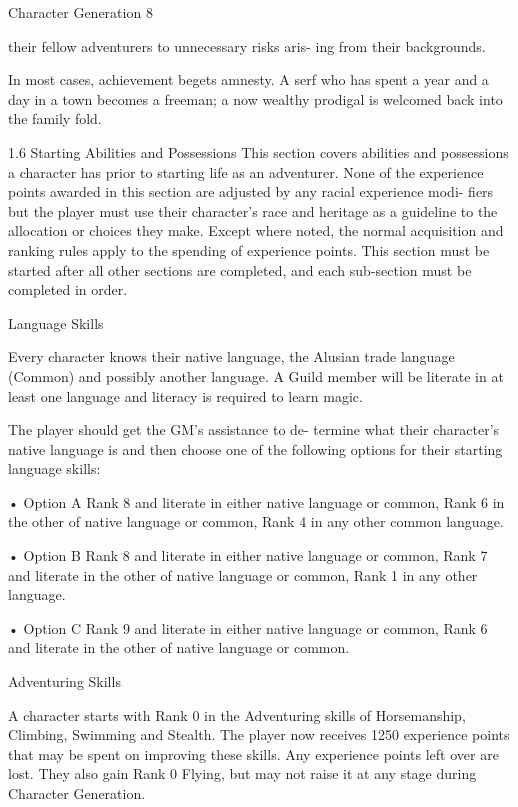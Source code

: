 \begin{Chapter}{Character Generation}
8 

their  fellow  adventurers  to  unnecessary  risks  aris-
ing from their backgrounds. 

In most cases, achievement begets amnesty. A serf 
who has spent a year and a day in a town becomes 
a  freeman;  a  now  wealthy  prodigal  is  welcomed 
back into the family fold. 

1.6 Starting Abilities and Possessions 
This  section  covers  abilities  and  possessions  a 
character has prior to starting life as an adventurer. 
None  of  the  experience  points  awarded  in  this 
section are adjusted by any racial experience modi-
fiers  but  the  player  must  use their character’s  race 
and  heritage  as  a  guideline  to  the  allocation  or 
choices they make. Except where noted, the normal 
acquisition and ranking rules apply to the spending 
of  experience  points.  This  section  must  be  started 
after  all  other  sections  are  completed,  and  each 
sub-section must be completed in order. 

Language Skills 

Every  character  knows  their  native  language,  the 
Alusian  trade  language  (Common)  and  possibly 
another language. A Guild member will be literate 
in at  least  one  language  and  literacy  is  required  to 
learn magic. 

The  player  should  get  the  GM’s  assistance  to  de-
termine  what  their  character’s  native  language  is 
and  then  choose  one  of  the  following  options  for 
their starting language skills: 

•  Option  A  Rank  8  and  literate  in  either  native 
language or common, Rank 6 in the other of native 
language or common, Rank 4 in any other common 
language. 

•  Option  B  Rank  8  and  literate  in  either  native 
language  or  common,  Rank  7  and  literate  in  the 
other of native language or common, Rank 1 in any 
other language. 

•  Option  C  Rank  9  and  literate  in  either  native 
language  or  common,  Rank  6  and  literate  in  the 
other of native language or common. 

Adventuring Skills 

A  character  starts  with Rank 0  in the  Adventuring 
skills  of  Horsemanship,  Climbing,  Swimming  and 
Stealth.  The  player  now  receives  1250  experience 
points that may be spent on improving these skills. 
Any experience points left over are lost. They also 
gain  Rank  0  Flying,  but  may  not  raise  it  at  any 
stage during Character Generation. 


\end{Chapter}
